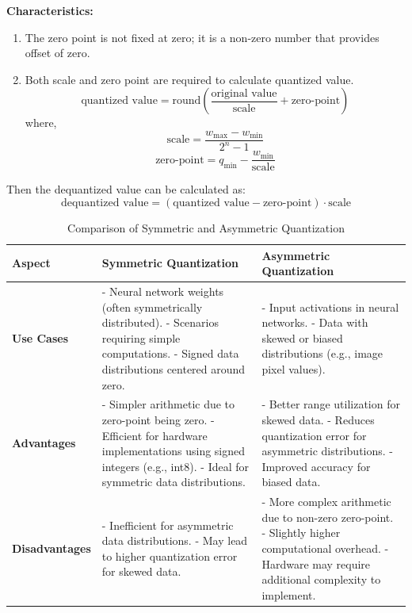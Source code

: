 \documentclass{ioereport}
\begin{document}
\textbf{Characteristics:}
\begin{enumerate}
    \item The zero point is not fixed at zero; it is a non-zero number that provides offset of zero.
    \item Both scale and zero point are required to calculate quantized value.
    \[
        \text{quantized value} = \text{round}\left(\frac{\text{original value}}{\text{scale}} + \text{zero-point}\right)
    \]
    where,
        \[
            \text{scale} = \frac{w_{\text{max}} - w_{\text{min}}}{2^n - 1}
        \]
        \[
            \text{zero-point} = q_{\text{min}} - \frac{w_{\text{min}}}{\text{scale}}
        \]
\end{enumerate}

Then the dequantized value can be calculated as:
\[ \text{dequantized value} = (\text{quantized value} - \text{zero-point}) \cdot \text{scale} \]

\begin{table}[H]
    \centering
    \caption{Comparison of Symmetric and Asymmetric Quantization}
    \label{tab:quantization_comparison}
    \begin{tabularx}{\textwidth}{|l|X|X|}
    \hline
    \textbf{Aspect} & \textbf{Symmetric Quantization} & \textbf{Asymmetric Quantization} \\ \hline
    \textbf{Use Cases} &
    - Neural network weights (often symmetrically distributed). \newline
    - Scenarios requiring simple computations. \newline
    - Signed data distributions centered around zero. &
    - Input activations in neural networks. \newline
    - Data with skewed or biased distributions (e.g., image pixel values).\\ \hline
    
    \textbf{Advantages} &
    - Simpler arithmetic due to zero-point being zero. \newline
    - Efficient for hardware implementations using signed integers (e.g., int8). \newline
    - Ideal for symmetric data distributions. &
    - Better range utilization for skewed data. \newline
    - Reduces quantization error for asymmetric distributions. \newline
    - Improved accuracy for biased data. \\ \hline
    
    \textbf{Disadvantages} &
    - Inefficient for asymmetric data distributions. \newline
    - May lead to higher quantization error for skewed data. &
    - More complex arithmetic due to non-zero zero-point. \newline
    - Slightly higher computational overhead. \newline
    - Hardware may require additional complexity to implement. \\ \hline
    \end{tabularx}
\end{table}
\end{document}
